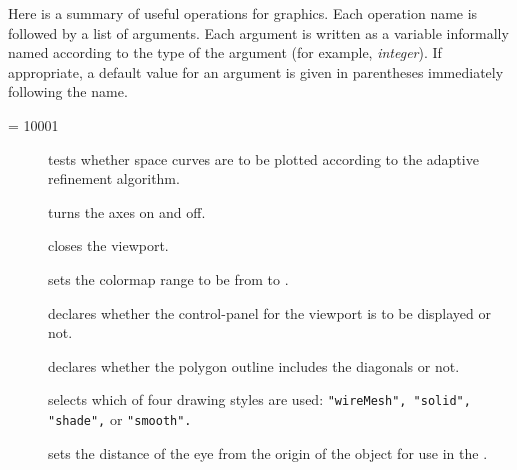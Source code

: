 
Here is a summary of useful \Language{} operations for \threedim{}
graphics.
Each operation name is followed by a list of arguments.
Each argument is written as a variable informally named according
to the type of the argument (for example, {\it integer}).
If appropriate, a default value for an argument is given in
parentheses immediately following the name.

%
\bgroup\hbadness = 10001\sloppy
\begin{description}
%
\item[]\funArgs{}
tests whether space curves are to be plotted
according to the
adaptive refinement algorithm.

%
\item[]
turns the axes on and off.

%
\item[]
closes the viewport.

%
\item[]
sets the colormap
range to be from
 to .

%
\item[]
declares whether the
control-panel for the viewport is to be displayed or not.

%
\item[]
declares whether the
polygon outline includes the diagonals or not.

%
\item[]
selects which of four drawing styles
are used: {\tt "wireMesh", "solid", "shade",} or {\tt "smooth".}

%
\item[]
sets the distance of the eye from the origin of the object
for use in the .


\end{description}
